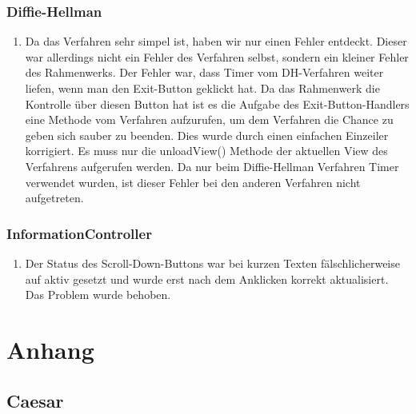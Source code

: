 \documentclass{article}
\begin{document}
     \subsubsection{Diffie-Hellman}
     \begin{enumerate}
         \item Da das Verfahren sehr simpel ist, haben wir nur einen Fehler entdeckt.
             Dieser war allerdings nicht ein Fehler des Verfahren selbst, sondern
             ein kleiner Fehler des Rahmenwerks. Der Fehler war, dass Timer vom DH-Verfahren weiter liefen,
             wenn man den Exit-Button geklickt hat. Da das Rahmenwerk die Kontrolle über diesen Button
             hat ist es die Aufgabe des Exit-Button-Handlers eine Methode vom Verfahren aufzurufen,
             um dem Verfahren die Chance zu geben sich sauber zu beenden. Dies wurde
             durch einen einfachen Einzeiler korrigiert. Es muss nur die unloadView() Methode der aktuellen
             View des Verfahrens aufgerufen werden.
             Da nur beim Diffie-Hellman Verfahren Timer verwendet wurden, ist dieser
             Fehler bei den anderen Verfahren nicht aufgetreten.
         \end{enumerate}

    \subsubsection{InformationController}
     \begin{enumerate}
         \item Der Status des Scroll-Down-Buttons war bei kurzen Texten fälschlicherweise auf aktiv gesetzt
         und wurde erst nach dem Anklicken korrekt aktualisiert. Das Problem wurde behoben.
         \end{enumerate}
\clearpage

\section{Anhang}

 \subsection{Caesar}
\end{document}
